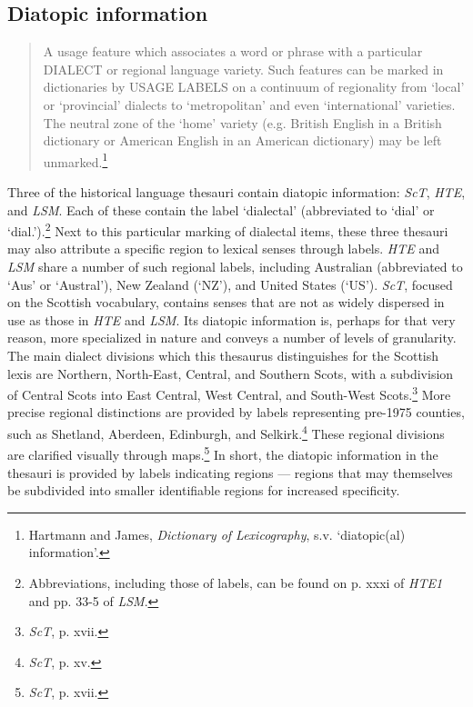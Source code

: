 \subsection*{Diatopic information}
\begin{quotation} \noindent
A usage feature which associates a word or phrase with a particular DIALECT or regional language variety. Such features can be marked in dictionaries by USAGE LABELS on a continuum of regionality from `local' or `provincial' dialects to `metropolitan' and even `international' varieties. The neutral zone of the `home' variety (e.g. British English in a British dictionary or American English in an American dictionary) may be left unmarked.\footnote{Hartmann and James, \textit{Dictionary of Lexicography}, s.v. `diatopic(al) information'.}
\end{quotation}
Three of the historical language thesauri contain diatopic information: \textit{ScT}, \textit{HTE}, and \textit{LSM}. Each of these contain the label `dialectal' (abbreviated to `dial' or `dial.').\footnote{Abbreviations, including those of labels, can be found on p. xxxi of \textit{HTE1} and pp. 33-5 of \textit{LSM}.} Next to this particular marking of dialectal items, these three thesauri may also attribute a specific region to lexical senses through labels. \textit{HTE} and \textit{LSM} share a number of such regional labels, including Australian (abbreviated to `Aus' or `Austral'), New Zealand (`NZ'), and United States (`US'). \textit{ScT}, focused on the Scottish vocabulary, contains senses that are not as widely dispersed in use as those in \textit{HTE} and \textit{LSM}. Its diatopic information is, perhaps for that very reason, more specialized in nature and conveys a number of levels of granularity. The main dialect divisions which this thesaurus distinguishes for the Scottish lexis are Northern, North-East, Central, and Southern Scots, with a subdivision of Central Scots into East Central, West Central, and South-West Scots.\footnote{\textit{ScT}, p. xvii.} More precise regional distinctions are provided by labels representing pre-1975 counties, such as Shetland, Aberdeen, Edinburgh, and Selkirk.\footnote{%
\textit{ScT}, p. xv.} These regional divisions are clarified visually through maps.\footnote{%
\textit{ScT}, p. xvii.} In short, the diatopic information in the thesauri is provided by labels indicating regions --- regions that may themselves be subdivided into smaller identifiable regions for increased specificity.

